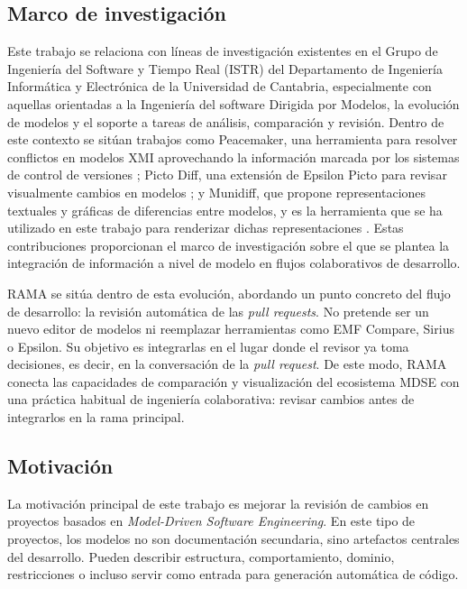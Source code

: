 \documentclass[11pt]{article}
\begin{document}
\subsection{Marco de investigación}

Este trabajo se relaciona con líneas de investigación existentes en el Grupo de Ingeniería del Software y Tiempo Real (ISTR) del Departamento de Ingeniería Informática y Electrónica de la Universidad de Cantabria, especialmente con aquellas orientadas a la Ingeniería del software Dirigida por Modelos, la evolución de modelos y el soporte a tareas de análisis, comparación y revisión. Dentro de este contexto se sitúan trabajos como Peacemaker, una herramienta para resolver conflictos en modelos XMI aprovechando la información marcada por los sistemas de control de versiones \cite{peacemaker}; Picto Diff, una extensión de Epsilon Picto para revisar visualmente cambios en modelos \cite{picto,picto-diff}; y Munidiff, que propone representaciones textuales y gráficas de diferencias entre modelos, y es la herramienta que se ha utilizado en este trabajo para renderizar dichas representaciones \cite{munidiff,munidiff-paper}. Estas contribuciones proporcionan el marco de investigación sobre el que se plantea la integración de información a nivel de modelo en flujos colaborativos de desarrollo.

RAMA se sitúa dentro de esta evolución, abordando un punto concreto del flujo de desarrollo: la revisión automática de las \textit{pull requests}. No pretende ser un nuevo editor de modelos ni reemplazar herramientas como EMF Compare, Sirius o Epsilon. Su objetivo es integrarlas en el lugar donde el revisor ya toma decisiones, es decir, en la conversación de la \textit{pull request}. De este modo, RAMA conecta las capacidades de comparación y visualización del ecosistema MDSE con una práctica habitual de ingeniería colaborativa: revisar cambios antes de integrarlos en la rama principal.

\subsection{Motivación}

La motivación principal de este trabajo es mejorar la revisión de cambios en proyectos basados en \textit{Model-Driven Software Engineering}. En este tipo de proyectos, los modelos no son documentación secundaria, sino artefactos centrales del desarrollo. Pueden describir estructura, comportamiento, dominio, restricciones o incluso servir como entrada para generación automática de código.
\end{document}
